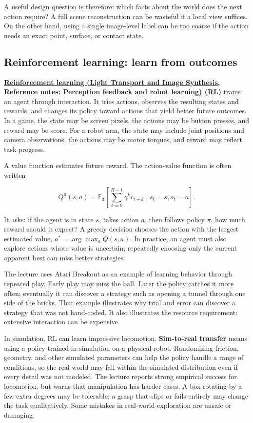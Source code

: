 A useful design question is therefore: which facts about the world does the next action require? A full scene reconstruction can be wasteful if a local view suffices. On the other hand, using a single image-level label can be too coarse if the action needs an exact point, surface, or contact state.

\subsection{Reinforcement learning: learn from outcomes}\label{04-visual-computing-ii-ch034-reinforcement-learning-learn-from-outcomes}

\textbf{\href{../04-Light-Transport-and-Image-Synthesis/main.pdf\#nameddest=appendix-b0c42da325f1}{Reinforcement learning (Light Transport and Image Synthesis, Reference notes: Perception feedback and robot learning)} (RL)} trains an agent through interaction. It tries actions, observes the resulting states and rewards, and changes its policy toward actions that yield better future outcomes. In a game, the state may be screen pixels, the actions may be button presses, and reward may be score. For a robot arm, the state may include joint positions and camera observations, the actions may be motor torques, and reward may reflect task progress.

A value function estimates future reward. The action-value function is often written

\[
Q^\pi(s,a)=\mathbb{E}_{\pi}\left[\sum_{k=0}^{H-1}\gamma^k r_{t+k}\mid s_t=s,a_t=a\right].
\]

It asks: if the agent is in state \(s\), takes action \(a\), then follows policy \(\pi\), how much reward should it expect? A greedy decision chooses the action with the largest estimated value, \(a^*=\arg\max_a Q(s,a)\). In practice, an agent must also explore actions whose value is uncertain; repeatedly choosing only the current apparent best can miss better strategies.

The lecture uses Atari Breakout as an example of learning behavior through repeated play. Early play may miss the ball. Later the policy catches it more often; eventually it can discover a strategy such as opening a tunnel through one side of the bricks. That example illustrates why trial and error can discover a strategy that was not hand-coded. It also illustrates the resource requirement: extensive interaction can be expensive.

In simulation, RL can learn impressive locomotion. \textbf{Sim-to-real transfer} means using a policy trained in simulation on a physical robot. Randomizing friction, geometry, and other simulated parameters can help the policy handle a range of conditions, so the real world may fall within the simulated distribution even if every detail was not modeled. The lecture reports strong empirical success for locomotion, but warns that manipulation has harder cases. A box rotating by a few extra degrees may be tolerable; a grasp that slips or fails entirely may change the task qualitatively. Some mistakes in real-world exploration are unsafe or damaging.

